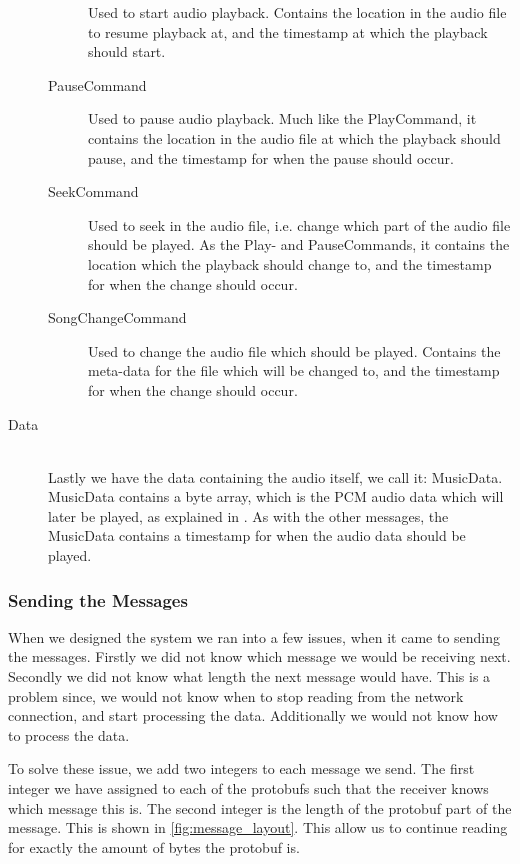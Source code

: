 \begin{description}
\begin{description}
                Used to start audio playback.
                Contains the location in the audio file to resume playback at, and the timestamp at which the playback should start.
            \item[PauseCommand]
                Used to pause audio playback.
                Much like the PlayCommand, it contains the location in the audio file at which the playback should pause, and the timestamp for when the pause should occur.
            \item[SeekCommand]
                Used to seek in the audio file, i.e. change which part of the audio file should be played.
                As the Play- and PauseCommands, it contains the location which the playback should change to, and the timestamp for when the change should occur.
            \item[SongChangeCommand]
                Used to change the audio file which should be played.
                Contains the meta-data for the file which will be changed to, and the timestamp for when the change should occur.
        \end{description}

    \item[Data] \hfill \\
        Lastly we have the data containing the audio itself, we call it: MusicData.
        MusicData contains a byte array, which is the \ac{PCM} audio data which will later be played, as explained in .
        As with the other messages, the MusicData contains a timestamp for when the audio data should be played.
\end{description}

\subsubsection{Sending the Messages}
When we designed the system we ran into a few issues, when it came to sending the messages.
Firstly we did not know which message we would be receiving next.
Secondly we did not know what length the next message would have.
This is a problem since, we would not know when to stop reading from the network connection, and start processing the data.
Additionally we would not know how to process the data.

To solve these issue, we add two integers to each message we send.
The first integer we have assigned to each of the protobufs such that the receiver knows which message this is.
The second integer is the length of the protobuf part of the message.
This is shown in \cref{fig:message_layout}.
This allow us to continue reading for exactly the amount of bytes the protobuf is.

